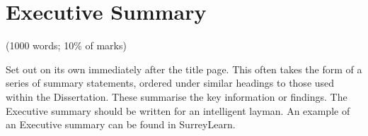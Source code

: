 
\chapter*{Executive Summary}\label{ch:executive summary}
(1000 words; 10\% of marks)

Set out on its own immediately after the title page.
This often takes the form of a series of summary statements, ordered under similar headings to those used within the Dissertation.
These summarise the key information or findings.
The Executive summary should be written for an intelligent layman.
An example of an Executive summary can be found in SurreyLearn.


\newpage